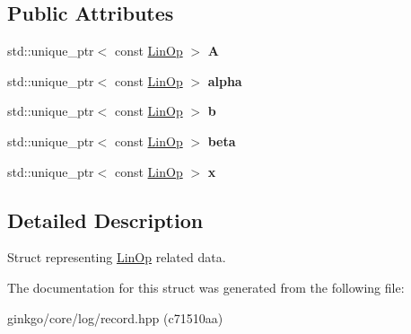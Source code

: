 \subsection*{Public Attributes}
\begin{DoxyCompactItemize}
\item 
\mbox{\label{structgko_1_1log_1_1linop__data_a02a1a3dacdf707cc5b6ee1173aad7aad}} 
std\+::unique\+\_\+ptr$<$ const \hyperlink{classgko_1_1LinOp}{Lin\+Op} $>$ {\bfseries A}
\item 
\mbox{\label{structgko_1_1log_1_1linop__data_ac65bf9ffa7f7d14a86b21d073d21471e}} 
std\+::unique\+\_\+ptr$<$ const \hyperlink{classgko_1_1LinOp}{Lin\+Op} $>$ {\bfseries alpha}
\item 
\mbox{\label{structgko_1_1log_1_1linop__data_aa03f552586f8de9e953057762d6e0b4b}} 
std\+::unique\+\_\+ptr$<$ const \hyperlink{classgko_1_1LinOp}{Lin\+Op} $>$ {\bfseries b}
\item 
\mbox{\label{structgko_1_1log_1_1linop__data_a5c0014fd2c39f067bbcc32e79b458b7b}} 
std\+::unique\+\_\+ptr$<$ const \hyperlink{classgko_1_1LinOp}{Lin\+Op} $>$ {\bfseries beta}
\item 
\mbox{\label{structgko_1_1log_1_1linop__data_a9c7297540351403305fc1633dad9fea6}} 
std\+::unique\+\_\+ptr$<$ const \hyperlink{classgko_1_1LinOp}{Lin\+Op} $>$ {\bfseries x}
\end{DoxyCompactItemize}


\subsection{Detailed Description}
Struct representing \hyperlink{classgko_1_1LinOp}{Lin\+Op} related data. 

The documentation for this struct was generated from the following file\+:\begin{DoxyCompactItemize}
\item 
ginkgo/core/log/record.\+hpp (c71510aa)\end{DoxyCompactItemize}
